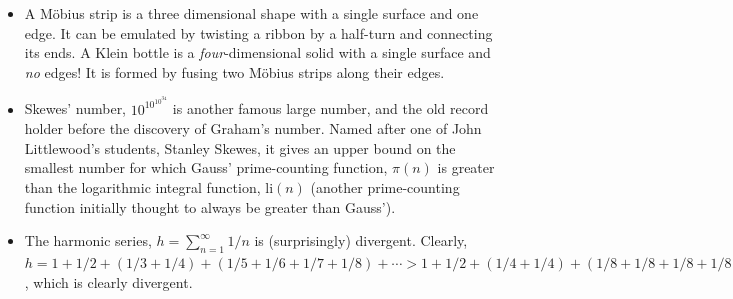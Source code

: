 \documentclass[11pt]{amsart}
\begin{document}
\begin{itemize}
\item A M\"obius strip is a three dimensional shape with a single surface and one edge. It can be emulated by twisting a ribbon by a half-turn and connecting its ends. A Klein bottle is a \emph{four}-dimensional solid with a single surface and \emph{no} edges! It is formed by fusing two M\"obius strips along their edges.
\item Skewes' number, $10^{10^{10^{34}}}$ is another famous large number, and the old record holder before the discovery of Graham's number. Named after one of John Littlewood's students, Stanley Skewes, it gives an upper bound on the smallest number for which Gauss' prime-counting function, $\pi(n)$ is greater than the logarithmic integral function, $\text{li}(n)$ (another prime-counting function initially thought to always be greater than Gauss').
\item The harmonic series, $h = \sum_{n=1}^{\infty} 1/n$ is (surprisingly) divergent. Clearly, $h = 1 + 1/2 + (1/3 + 1/4) + (1/5 + 1/6 + 1/7 + 1/8) + \cdots > 1 + 1/2 + (1/4 + 1/4) + (1/8 + 1/8 + 1/8 + 1/8) \cdots = 1 + 1/2 + 1/2 + 1/2 + \cdots$, which is clearly divergent.
\end{itemize}



\end{document}
